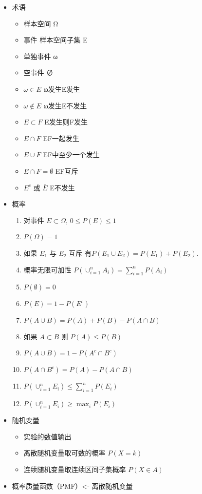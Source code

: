 \documentclass[
]{book}
\providecommand{\tightlist}{%
  \setlength{\itemsep}{0pt}\setlength{\parskip}{0pt}}
\begin{document}
\begin{itemize}
\tightlist
\item
  术语

  \begin{itemize}
  \tightlist
  \item
    样本空间 Ω
  \item
    事件 样本空间子集 E
  \item
    单独事件 ω
  \item
    空事件 ∅
  \item
    \(ω∈E\) ω发生E发生
  \item
    \(ω∉E\) ω发生E不发生
  \item
    \(E⊂F\) E发生则F发生
  \item
    \(E∩F\) EF一起发生
  \item
    \(E∪F\) EF中至少一个发生
  \item
    \(E∩F=∅\) EF互斥
  \item
    \(E^c\) 或 \(\bar E\) E不发生
  \end{itemize}
\item
  概率

  \begin{enumerate}
  \def\labelenumi{\arabic{enumi}.}
  \tightlist
  \item
    对事件 \(E\subset \Omega\), \(0 \leq P(E) \leq 1\)
  \item
    \(P(\Omega) = 1\)
  \item
    如果 \(E_1\) 与 \(E_2\) 互斥 有\(P(E_1 \cup E_2) = P(E_1) + P(E_2)\).
  \item
    概率无限可加性 \(P(\cup_{i=1}^n A_i) = \sum_{i=1}^n P(A_i)\)
  \item
    \(P(\emptyset) = 0\)
  \item
    \(P(E) = 1 - P(E^c)\)
  \item
    \(P(A \cup B) = P(A) + P(B) - P(A \cap B)\)
  \item
    如果 \(A \subset B\) 则 \(P(A) \leq P(B)\)
  \item
    \(P\left(A \cup B\right) = 1 - P(A^c \cap B^c)\)
  \item
    \(P(A \cap B^c) = P(A) - P(A \cap B)\)
  \item
    \(P(\cup_{i=1}^n E_i) \leq \sum_{i=1}^n P(E_i)\)
  \item
    \(P(\cup_{i=1}^n E_i) \geq \max_i P(E_i)\)
  \end{enumerate}
\item
  随机变量

  \begin{itemize}
  \tightlist
  \item
    实验的数值输出
  \item
    离散随机变量取可数的概率 \(P(X = k)\)
  \item
    连续随机变量取连续区间子集概率 \(P(X \in A)\)
  \end{itemize}
\item
  概率质量函数（PMF）\textless- 离散随机变量


\end{itemize}
\end{document}
